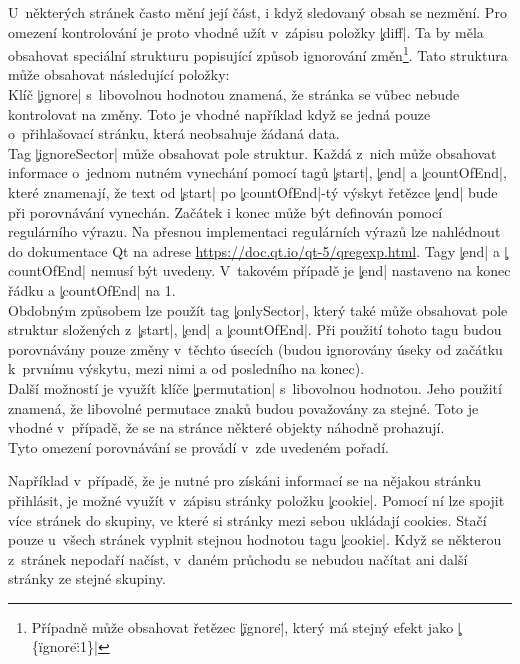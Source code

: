 U~některých stránek často mění její část, i když sledovaný obsah se nezmění.
Pro omezení kontrolování je proto vhodné užít v~zápisu položky \c|diff|.
Ta by měla obsahovat speciální strukturu  popisující způsob ignorování změn\footnote{Případně může obsahovat řetězec \c|\"ignore\"|, který má stejný efekt jako \c|\{\"ignore\":1\}|}.
Tato struktura může obsahovat následující položky:\\
Klíč \c|ignore| s~libovolnou hodnotou znamená, že stránka se vůbec nebude kontrolovat na změny.
Toto je vhodné například když se jedná pouze o~přihlašovací stránku, která neobsahuje žádaná data.\\
Tag \c|ignoreSector| může obsahovat pole struktur.
Každá z~nich může obsahovat informace o~jednom nutném vynechání pomocí tagů \c|start|, \c|end| a \c|countOfEnd|,
které znamenají, že text od \c|start| po \c|countOfEnd|-tý výskyt řetězce \c|end| bude při porovnávání vynechán.
Začátek i konec může být definován pomocí regulárního výrazu.
Na přesnou implementaci regulárních výrazů lze nahlédnout do dokumentace Qt na adrese
\url{https://doc.qt.io/qt-5/qregexp.html}.
Tagy \c|end| a \c|countOfEnd| nemusí být uvedeny. V~takovém případě je \c|end| nastaveno na konec řádku a \c|countOfEnd| na 1.
\\
Obdobným způsobem lze použít tag \c|onlySector|, který také může obsahovat pole struktur složených z~\c|start|, \c|end| a \c|countOfEnd|.
Při použití tohoto tagu budou porovnávány pouze změny v~těchto úsecích (budou ignorovány úseky od začátku k~prvnímu výskytu, mezi nimi a od posledního na konec).
\\
Další možností je využít klíče \c|permutation| s~libovolnou hodnotou.
Jeho použití znamená, že libovolné permutace znaků budou považovány za stejné.
Toto je vhodné v~případě, že se na stránce některé objekty náhodně prohazují.
\\
Tyto omezení porovnávání se provádí v~zde uvedeném pořadí.




Například v~případě, že je nutné pro získáni informací se na nějakou stránku přihlásit, je možné využít v~zápisu stránky položku \c|cookie|.
Pomocí ní lze spojit více stránek do skupiny, ve které si stránky mezi sebou ukládají cookies.
Stačí pouze u~všech stránek vyplnit stejnou hodnotou tagu \c|cookie|.
Když se některou z~stránek nepodaří načíst, v~daném průchodu se nebudou načítat ani další stránky ze stejné skupiny.
